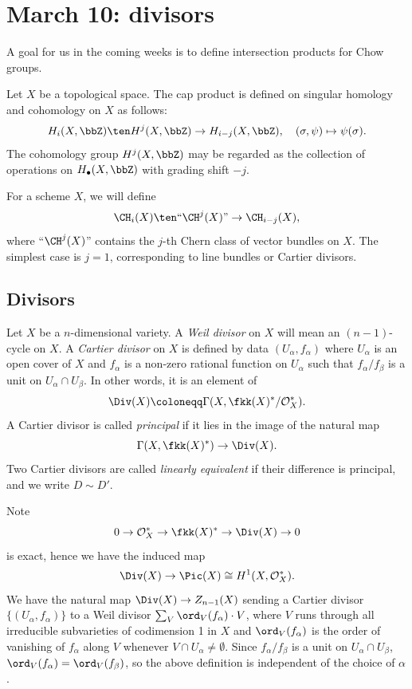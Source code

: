 \section{March 10: divisors}

A goal for us in the coming weeks is to define intersection products for Chow groups.

\begin{example}
  Let $X$ be a topological space. 
  The cap product is defined on singular homology and cohomology on $X$ as follows:
  \[ H_i (X,\bbZ) \ten H^j (X,\bbZ) \to H_{i-j}(X,\bbZ), \quad (\sigma, \psi) \mapsto \psi(\sigma). \]
  The cohomology group $H^j (X,\bbZ)$ may be regarded as the collection of operations on $H_\bullet (X, \bbZ)$ with grading shift $-j$.
\end{example}

For a scheme $X$, we will define 
\[ \CH_i (X) \ten  \text{``}\CH^j (X)\text{''} \to \CH_{i-j} (X), \]
where ``$\CH^j (X)$'' contains the $j$-th Chern class of vector bundles on $X$.
The simplest case is $j = 1$, corresponding to line bundles or Cartier divisors.

\subsection{Divisors}

  \begin{definition}
    Let $X$ be a $n$-dimensional variety.
    A \emph{Weil divisor} on $X$ will mean an $(n-1)$-cycle on $X$.
    A \emph{Cartier divisor} on $X$ is defined by data ${(U_\alpha, f_\alpha)}$ where ${U_\alpha}$ is an open cover of $X$ and $f_\alpha$ is a non-zero rational function on $U_\alpha$ such that $f_\alpha / f_\beta$ is a unit on $U_\alpha \cap U_\beta$.
    In other words, it is an element of 
    \[ \Div (X) \coloneqq \Gamma (X, \fkk(X)^* / \mathcal{O}_X^*). \]
    A Cartier divisor is called \emph{principal} if it lies in the image of the natural map 
    \[ \Gamma (X, \fkk(X)^*) \to \Div (X) . \]
    Two Cartier divisors are called \emph{linearly equivalent} if their difference is principal, and we write $D \sim D'$.
  \end{definition}

  Note 
  \[ 0 \to \mathcal{O}_X^* \to \fkk(X)^* \to \Div (X) \to 0 \] is exact, hence we have the induced map
  \[ \Div (X) \to \Pic (X) \cong H^1 (X, \mathcal{O}_X^*). \]
  We have the natural map $\Div (X) \to Z_{n-1} (X)$ sending a Cartier divisor $\{(U_\alpha, f_\alpha)\}$ to a Weil divisor $\sum_V \ord_V (f_\alpha) \cdot V$, where $V$ runs through all irreducible subvarieties of codimension 1 in $X$ and $\ord_V (f_\alpha)$ is the order of vanishing of $f_\alpha$ along $V$ whenever $V \cap U_\alpha \neq \emptyset$.
  Since $f_\alpha / f_\beta$ is a unit on $U_\alpha \cap U_\beta$, $\ord_V (f_\alpha) = \ord_V (f_\beta)$, so the above definition is independent of the choice of $\alpha$.


